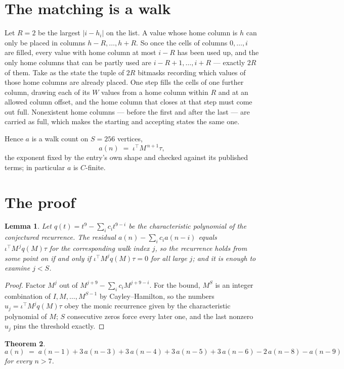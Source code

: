 \documentclass[11pt,a4paper]{article}
\theoremstyle{plain}
\newtheorem{theorem}{Theorem}
\newtheorem{lemma}[theorem]{Lemma}
\theoremstyle{definition}
\begin{document}
\section{The matching is a walk}

Let $R=2$ be the largest $|i-h_i|$ on the list. A value whose home column is $h$ can only be
placed in columns $h-R,\dots,h+R$. So once the cells of columns $0,\dots,i$ are filled, every
value with home column at most $i-R$ has been used up, and the only home columns that can be
partly used are $i-R+1,\dots,i+R$ --- exactly $2R$ of them. Take as the state the tuple of
$2R$ bitmasks recording which values of those home columns are already placed. One step fills
the cells of one further column, drawing each of its $W$ values from a home column within $R$
and at an allowed column offset, and the home column that closes at that step must come out
full. Nonexistent home columns --- before the first and after the last --- are carried as
full, which makes the starting and accepting states the same one.

Hence $a$ is a walk count on $S=256$ vertices,
\[
a(n)\;=\;\iota^{\!\top}M^{\,n+1}\tau ,
\]
the exponent fixed by the entry's own shape and checked against its published terms; in
particular $a$ is $C$-finite.

\section{The proof}

\begin{lemma}\label{lem:crit}
Let $q(t)=t^{9}-\sum_i c_it^{9-i}$ be the characteristic polynomial of the
conjectured recurrence. The residual $a(n)-\sum_ic_ia(n-i)$ equals
$\iota^{\!\top}M^{\,j}q(M)\tau$ for the corresponding walk index $j$, so the recurrence
holds from some point on if and only if $\iota^{\!\top}M^{j}q(M)\tau=0$ for all large $j$;
and it is enough to examine $j<S$.
\end{lemma}

\begin{proof}
Factor $M^{j}$ out of $M^{j+9}-\sum_ic_iM^{j+9-i}$. For the bound, $M^{S}$
is an integer combination of $I,M,\dots,M^{S-1}$ by Cayley--Hamilton, so the numbers
$u_j=\iota^{\!\top}M^{j}q(M)\tau$ obey the monic recurrence given by the characteristic
polynomial of $M$; $S$ consecutive zeros force every later one, and the last nonzero $u_j$
pins the threshold exactly.
\end{proof}

\begin{theorem}
\[
a(n)\;=\;a(n-1) + 3\,a(n-3) + 3\,a(n-4) + 3\,a(n-5) + 3\,a(n-6) - 2\,a(n-8) - a(n-9)
\]
for every $n>7$.
\end{theorem}
\end{document}
